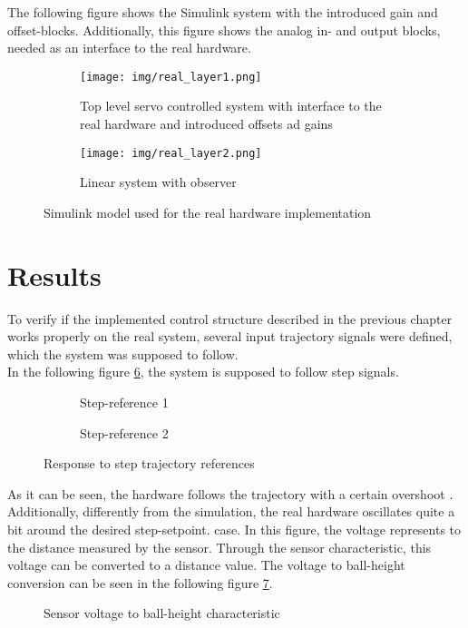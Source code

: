 The following figure shows the Simulink system with the introduced gain and offset-blocks. Additionally, this figure shows the analog in- and output blocks, needed as an interface to the real hardware. 
\begin{figure}[!h]
\centering
    \begin{subfigure}{\textwidth}
      \centering
      \texttt{[image: img/real\_layer1.png]}
      \caption[Top level servo controlled system]{Top level servo controlled system with interface to the real hardware and introduced offsets ad gains}
      \label{fig:simlayer1}
    \end{subfigure}
    \begin{subfigure}{\textwidth}
      \centering
      \texttt{[image: img/real\_layer2.png]}
      \caption{Linear system with observer}
      \label{fig:simlayer2}
    \end{subfigure}   
    \caption[Simulink model used for the real hardware implementation]{Simulink model used for the real hardware implementation}
    \label{fig:Simulink_sim_model}
\end{figure}
\section{Results}
\label{res}
To verify if the implemented control structure described in the previous chapter works properly on the real system, several input trajectory signals were defined, which the system was supposed to follow. 
\\In the following figure \ref{fig:step}, the system is supposed to follow step signals. 
\begin{figure}[!h]
\centering
    \begin{subfigure}{.5\textwidth}
      \centering
      
      \caption{Step-reference 1}
      \label{fig:01}
    \end{subfigure}%
    \begin{subfigure}{.5\textwidth}
      \centering
      
      \caption{Step-reference 2}
      \label{fig:02}
    \end{subfigure}
    \caption{Response to step trajectory references}
    \label{fig:step}
\end{figure}

As it can be seen, the hardware follows the trajectory with a certain overshoot . Additionally, differently from the simulation, the real hardware oscillates quite a bit around the desired step-setpoint.   case. In this figure, the voltage represents to the distance measured by the sensor. Through the sensor characteristic, this voltage can be converted to a distance value. The voltage to ball-height conversion can be seen in the following figure \ref{fig:volt_dist}. 
\begin{figure}[!h]
        \centering
        
        \caption[Sensor voltage to ball-height characteristic]{Sensor voltage to ball-height characteristic}
        \label{fig:volt_dist}
\end{figure}

